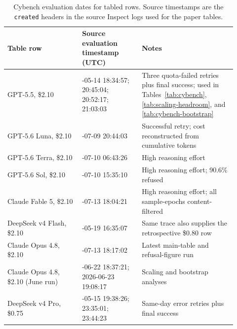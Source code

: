 \documentclass{jmlr}%
\begin{document}
\begin{table}[htbp]
\centering
\caption{Cybench evaluation dates for tabled rows. Source timestamps are the \texttt{created} headers in the source Inspect logs used for the paper tables.}
\label{tab:cybench-eval-dates}
\small
\begin{tabular}{@{}>{\raggedright\arraybackslash}p{0.30\linewidth}>{\raggedright\arraybackslash}p{0.24\linewidth}>{\raggedright\arraybackslash}p{0.38\linewidth}@{}}
\toprule
Table row & Source evaluation timestamp (UTC) & Notes \\
\midrule
GPT-5.5, \$2.10 & 2026-05-14 18:34:57; 20:45:04; 20:52:17; 21:03:03 & Three quota-failed retries plus final success; used in Tables~\ref{tab:cybench}, \ref{tab:scaling-headroom}, and \ref{tab:cybench-bootstrap} \\
GPT-5.6 Luna, \$2.10 & 2026-07-09 20:44:03 & Successful retry; cost reconstructed from cumulative tokens \\
GPT-5.6 Terra, \$2.10 & 2026-07-10 06:43:26 & High reasoning effort \\
GPT-5.6 Sol, \$2.10 & 2026-07-10 15:35:10 & High reasoning effort; 90.6\% refused \\
Claude Fable 5, \$2.10 & 2026-07-13 18:04:21 & High reasoning effort; all sample-epochs content-filtered \\
DeepSeek v4 Flash, \$2.10 & 2026-05-19 16:35:07 & Same trace also supplies the retrospective \$0.80 row \\
Claude Opus 4.8, \$2.10 & 2026-07-13 18:17:02 & Latest main-table and refusal-figure run \\
Claude Opus 4.8, \$2.10 (June run) & 2026-06-22 18:37:21; 2026-06-23 19:08:17 & Scaling and bootstrap analyses \\
DeepSeek v4 Pro, \$0.75 & 2026-05-15 19:38:26; 23:35:01; 23:44:23 & Same-day error retries plus final success \\
\bottomrule
\end{tabular}
\end{table}
\end{document}
